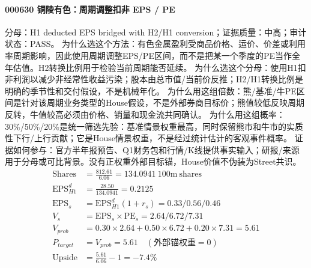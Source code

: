 \paragraph{000630 铜陵有色：周期调整扣非 EPS / PE}
分母：H1 deducted EPS bridged with H2/H1 conversion；证据质量：中高；审计状态：PASS。
为什么选这个方法：有色金属盈利受商品价格、运价、价差或利用率周期影响，因此使用周期调整EPS/PE区间，而不是把某一个季度的PE当作全年估值。H2转换比例用于检验当前周期能否延续。
为什么选这个分母：使用H1扣非利润以减少非经常性收益污染；股本由总市值/当前价反推；H2/H1转换比例是明确的季节性和交付假设，不是机械年化。
为什么用这组倍数：熊/基准/牛PE区间是针对该周期业务类型的House假设，不是外部券商目标价；熊值较低反映周期反转，牛值较高必须由价格、销量和现金流共同确认。
为什么用这组概率：30\%/50\%/20\%是统一筛选先验：基准情景权重最高，同时保留熊市和牛市的实质性下行/上行贡献；它是House情景权重，不是经过统计估计的客观事件概率。
证据如何参与：官方半年报预告、Q1财务包和行情/K线提供事实输入；研报/来源用于分母或可比背景。没有正权重外部目标锚，House价值不伪装为Street共识。
\begin{align*}
\mathrm{Shares} &= \frac{812.61}{6.06}=134.0941\ \mathrm{100m\ shares}\\
\mathrm{EPS}_{H1}^d &= \frac{28.50}{134.0941}=0.2125\\
\mathrm{EPS}_s &= \mathrm{EPS}_{H1}^d(1+r_s)=0.33/0.56/0.46\\
V_s &= \mathrm{EPS}_s\times \mathrm{PE}_s=2.64/6.72/7.31\\
V_{prob} &= 0.30\times 2.64+0.50\times 6.72+0.20\times 7.31=5.61\\
P_{target} &= V_{prob}=5.61\quad(\text{外部锚权重}=0)\\
\mathrm{Upside} &= \frac{5.61}{6.06}-1=-7.4\%\\
\end{align*}


